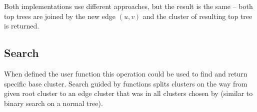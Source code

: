 Both implementations use different approaches, but the result is the same --
both top trees are joined by the new edge $(u,v)$ and the cluster of resulting
top tree is returned.

\subsection{\sc Search}

When defined the \Choose{} user function this operation could be used to find
and return specific base cluster. Search guided by \Choose{} functions splits
clusters on the way from given root cluster to an edge cluster that was in all
clusters chosen by \Choose{} (similar to binary search on a normal tree).
